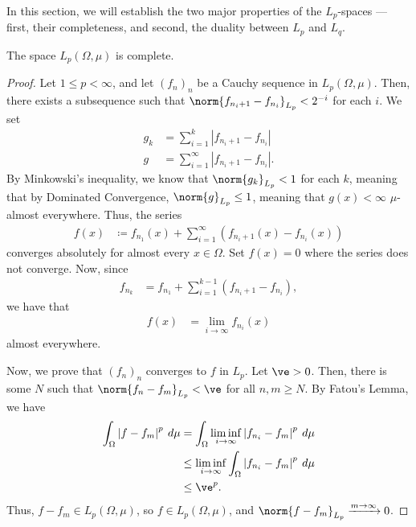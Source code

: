 \documentclass[12pt]{mypackage}
\begin{document}
In this section, we will establish the two major properties of the $L_p$-spaces --- first, their completeness, and second, the duality between $L_p$ and $L_q$.
\begin{theorem}
  The space $L_p\left( \Omega,\mu \right)$ is complete.
\end{theorem}
\begin{proof}
  Let $1 \leq p < \infty$, and let $\left( f_n \right)_n$ be a Cauchy sequence in $L_p\left( \Omega,\mu \right)$. Then, there exists a subsequence such that $\norm{f_{n_i + 1} - f_{n_i}}_{L_p} < 2^{-i}$ for each $i$. We set
  \begin{align*}
    g_k &= \sum_{i=1}^{k}\left\vert f_{n_i + 1} - f_{n_i} \right\vert\\
    g &= \sum_{i=1}^{\infty}\left\vert f_{n_i + 1} - f_{n_i} \right\vert.
  \end{align*}
  By Minkowski's inequality, we know that $\norm{g_k}_{L_p} < 1$ for each $k$, meaning that by Dominated Convergence, $\norm{g}_{L_p} \leq 1$, meaning that $g(x) < \infty$ $\mu$-almost everywhere. Thus, the series 
  \begin{align*}
    f(x) &\coloneq f_{n_1}(x) + \sum_{i=1}^{\infty}\left( f_{n_i + 1}\left( x \right) -  f_{n_i}\left( x \right)\right)
  \end{align*}
  converges absolutely for almost every $x\in \Omega$. Set $f(x) = 0$ where the series does not converge. Now, since
  \begin{align*}
    f_{n_k} &= f_{n_1} + \sum_{i=1}^{k-1}\left( f_{n_i + 1} - f_{n_i} \right),
  \end{align*}
  we have that
  \begin{align*}
    f(x) &= \lim_{i\rightarrow\infty}f_{n_i}(x)
  \end{align*}
  almost everywhere.\newline

  Now, we prove that $\left( f_n \right)_n$ converges to $f$ in $L_p$. Let $\ve > 0$. Then, there is some $N$ such that $\norm{f_n - f_m}_{L_p} < \ve$ for all $n,m \geq N$. By Fatou's Lemma, we have
  \begin{align*}
    \int_{\Omega}^{} \left\vert f-f_m \right\vert^{p}\:d\mu &= \int_{\Omega}^{} \liminf_{i\rightarrow\infty}\left\vert f_{n_i} - f_m \right\vert^{p}\:d\mu\\
                                                            &\leq \liminf_{i\rightarrow\infty}\int_{\Omega}^{} \left\vert f_{n_i} - f_m \right\vert^{p}\:d\mu\\
                                                            &\leq \ve^{p}.
  \end{align*}
  Thus, $f-f_m\in L_p\left( \Omega,\mu \right)$, so $f\in L_p\left( \Omega,\mu \right)$, and $\norm{f - f_m}_{L_p}\xrightarrow{m\rightarrow\infty} 0$.
\end{proof}
\end{document}
